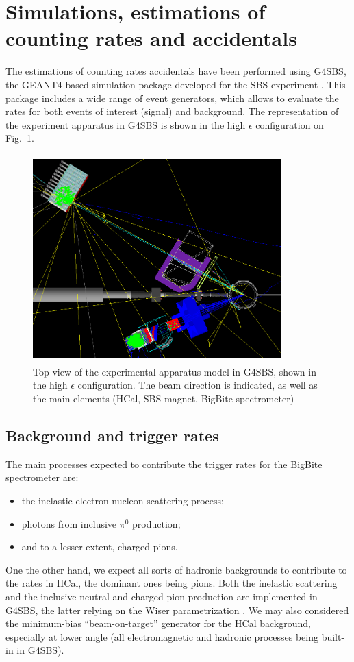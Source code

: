 
\section{Simulations, estimations of counting rates and accidentals}\label{sec:simu}

The estimations of counting rates accidentals have been performed using G4SBS, the GEANT4-based simulation package developed for the SBS experiment \cite{g4sbs}.
This package includes a wide range of event generators, which allows to evaluate the rates for both events of interest (signal) and background.
The representation of the experiment apparatus in G4SBS is shown in the high $\epsilon$ configuration on Fig.~\ref{fig:g4sbssetup}. 

\begin{figure}[!h]
  \centering
    \includegraphics[width=9.6cm,height=8cm]{Plots/SetupHiEPoint.png}
    \caption{Top view of the experimental apparatus model in G4SBS, shown in the high $\epsilon$ configuration. The beam direction is indicated, as well as the main elements (HCal, SBS magnet, BigBite spectrometer)}
    \label{fig:g4sbssetup}
\end{figure}

\subsection{Background and trigger rates}
The main processes expected to contribute the trigger rates for the BigBite spectrometer are:
%
\begin{itemize}
\item{the inelastic electron nucleon scattering process;}
\item{photons from inclusive $\pi^0$ production;}
\item{and to a lesser extent, charged pions.}
\end{itemize}
%
One the other hand, we expect all sorts of hadronic backgrounds to contribute to the rates in HCal, the dominant ones being pions.
Both the inelastic scattering and the inclusive neutral and charged pion production are implemented in G4SBS, the latter relying on the Wiser parametrization \cite{wiser}.
We may also considered the minimum-bias ``beam-on-target'' generator for the HCal background, especially at lower angle (all electromagnetic and hadronic processes being built-in in G4SBS).

